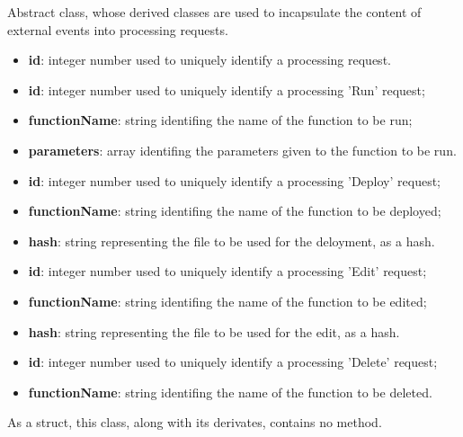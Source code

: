 	Abstract class, whose derived classes are used to incapsulate the content of external events into processing requests.
	\begin{itemize}
		\item \textbf{id}: integer number used to uniquely identify a processing request.
	\end{itemize}
	\begin{itemize}
		\item \textbf{id}: integer number used to uniquely identify a processing 'Run' request;
		\item \textbf{functionName}: string identifing the name of the function to be run;
		\item \textbf{parameters}: array identifing the parameters given to the function to be run.
	\end{itemize}
	\begin{itemize}
		\item \textbf{id}: integer number used to uniquely identify a processing 'Deploy' request;
		\item \textbf{functionName}: string identifing the name of the function to be deployed;
		\item \textbf{hash}: string representing the file to be used for the deloyment, as a hash.
	\end{itemize}
	\begin{itemize}
		\item \textbf{id}: integer number used to uniquely identify a processing 'Edit' request;
		\item \textbf{functionName}: string identifing the name of the function to be edited;
		\item \textbf{hash}: string representing the file to be used for the edit, as a hash.
	\end{itemize}
	\begin{itemize}
		\item \textbf{id}: integer number used to uniquely identify a processing 'Delete' request;
		\item \textbf{functionName}: string identifing the name of the function to be deleted.
	\end{itemize}

	As a struct, this class, along with its derivates, contains no method.
